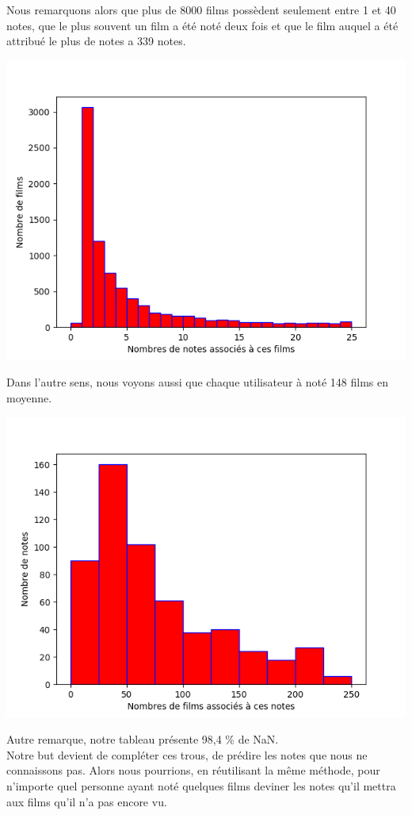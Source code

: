 \documentclass[a4paper,10pt]{article}
\begin{document}
Nous remarquons alors que plus de 8000 films possèdent seulement entre 1 et 40 notes, que le plus souvent un film a été noté deux fois et que le film auquel a été attribué le plus de notes a 339 notes.

\includegraphics[scale=0.5]{hist2.png}

Dans l’autre sens, nous voyons aussi que chaque utilisateur à noté 148 films en moyenne.

\includegraphics[scale=0.5]{hist1.png}

Autre remarque, notre tableau présente 98,4 \% de NaN.\\

Notre but devient de compléter ces trous, de prédire les notes que nous ne connaissons pas. Alors nous pourrions, en réutilisant la même méthode, pour n'importe quel personne ayant noté quelques films deviner les notes qu'il mettra aux films qu'il n'a pas encore vu.
\end{document}
